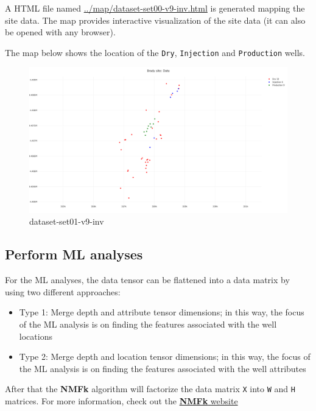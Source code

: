 \documentclass[11pt]{article}
\providecommand{\tightlist}{%
      \setlength{\itemsep}{0pt}\setlength{\parskip}{0pt}}
\begin{document}
    A HTML file named \url{../map/dataset-set00-v9-inv.html} is generated
mapping the site data. The map provides interactive visualization of the
site data (it can also be opened with any browser).

The map below shows the location of the \texttt{Dry}, \texttt{Injection}
and \texttt{Production} wells.

\begin{figure}
\centering
\includegraphics{../map/dataset-set01-v9-inv.png}
\caption{dataset-set01-v9-inv}
\end{figure}

    \hypertarget{perform-ml-analyses}{%
\subsection{Perform ML analyses}\label{perform-ml-analyses}}

For the ML analyses, the data tensor can be flattened into a data matrix
by using two different approaches:

\begin{itemize}
\tightlist
\item
  Type 1: Merge depth and attribute tensor dimensions; in this way, the
  focus of the ML analysis is on finding the features associated with
  the well locations
\item
  Type 2: Merge depth and location tensor dimensions; in this way, the
  focus of the ML analysis is on finding the features associated with
  the well attributes
\end{itemize}

After that the \textbf{NMFk} algorithm will factorize the data matrix
\texttt{X} into \texttt{W} and \texttt{H} matrices. For more
information, check out the
\href{https://github.com/SmartTensors/NMFk.jl}{\textbf{NMFk} website}
\end{document}
